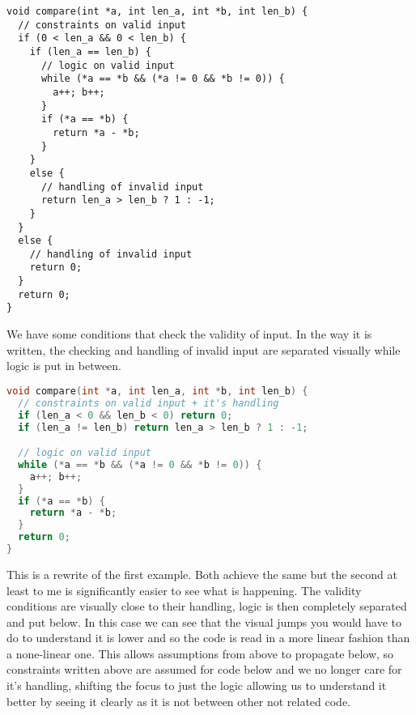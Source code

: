 \documentclass[a4paper]{article}
\begin{document}
\begin{lstlisting}
void compare(int *a, int len_a, int *b, int len_b) { 
  // constraints on valid input
  if (0 < len_a && 0 < len_b) {
    if (len_a == len_b) {
      // logic on valid input
      while (*a == *b && (*a != 0 && *b != 0)) { 
        a++; b++;
      }
      if (*a == *b) { 
        return *a - *b;
      }
    }
    else {
      // handling of invalid input
      return len_a > len_b ? 1 : -1; 
    }
  }
  else { 
    // handling of invalid input
    return 0; 
  }
  return 0;
}   
\end{lstlisting}

We have some conditions that check the validity of input. In the way it is written, the checking and handling of invalid input are separated visually while logic is put in between. 

\begin{lstlisting}[language=c++]
void compare(int *a, int len_a, int *b, int len_b) { 
  // constraints on valid input + it's handling
  if (len_a < 0 && len_b < 0) return 0;
  if (len_a != len_b) return len_a > len_b ? 1 : -1;

  // logic on valid input
  while (*a == *b && (*a != 0 && *b != 0)) { 
    a++; b++;
  }
  if (*a == *b) { 
    return *a - *b;
  }
  return 0;
}
\end{lstlisting}

This is a rewrite of the first example. Both achieve the same but the second at least to me is significantly easier to see what is happening. The validity conditions are visually close to their handling, logic is then completely separated and put below. In this case we can see that the visual jumps you would have to do to understand it is lower and so the code is read in a more linear fashion than a none-linear one. This allows assumptions from above to propagate below, so constraints written above are assumed for code below and we no longer care for it's handling, shifting the focus to just the logic allowing us to understand it better by seeing it clearly as it is not between other not related code. 
\end{document}
